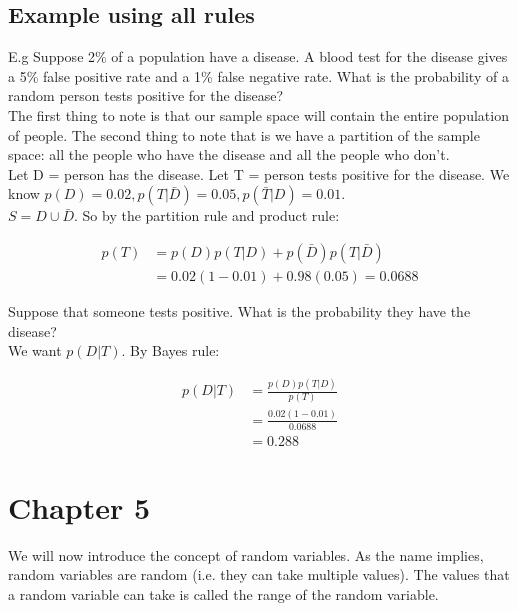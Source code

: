 \documentclass[12pt, letterpaper]{article}
\begin{document}
\subsection{Example using all rules}
E.g Suppose 2\% of a population have a disease. A blood test for the disease gives a 5\% false positive rate and a 1\% false negative rate. What is the probability of a random person tests positive for the disease?\\

The first thing to note is that our sample space will contain the entire population of people. The second thing to note that is we have a partition of the sample space: all the people who have the disease and all the people who don't.\\

Let D = person has the disease. Let T = person tests positive for the disease. We know \(p\left(D\right) = 0.02, p(T|\bar{D}) = 0.05, p\left(\bar{T}|D\right) = 0.01\).\\

\(S = D \cup \bar{D}\). So by the partition rule and product rule:

\begin{align*}
p\left(T\right) &= p\left(D\right)p\left(T|D\right) + p\left(\bar{D}\right)p\left(T|\bar{D}\right)\\
&= 0.02(1 - 0.01) + 0.98(0.05) = 0.0688
\end{align*}

Suppose that someone tests positive. What is the probability they have the disease?\\

We want \(p\left(D|T\right)\). By Bayes rule:

\begin{align*}
p\left(D|T\right) &= \frac{p\left(D\right)p\left(T|D\right)}{p\left(T\right)}\\
&= \frac{0.02(1 - 0.01)}{0.0688}\\
&= 0.288
\end{align*}

\newpage

\section{Chapter 5}
We will now introduce the concept of random variables. As the name implies, random variables are random (i.e. they can take multiple values). The values that a random variable can take is called the range of the random variable.\\
\end{document}
